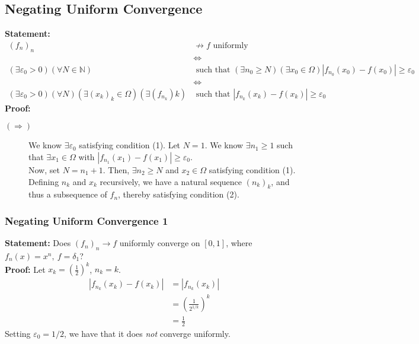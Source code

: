\documentclass[10pt]{extarticle}
\newcommand{\N}{\mathbb{N}}
\begin{document}
  \subsection{Negating Uniform Convergence}%
  \textbf{Statement:}
    \begin{align*}
      (f_n)_n &\nrightarrow f \text{ uniformly }\\
              &\Leftrightarrow\\
      (\exists \varepsilon_0 > 0)(\forall N\in\N)&\text{ such that } (\exists n_0 \geq N)(\exists x_0\in\Omega) \left|f_{n_0}(x_0) - f(x_0)\right| \geq \varepsilon_0\\
                                                 &\Leftrightarrow\\
      (\exists \varepsilon_0 > 0)(\forall N)(\exists (x_k)_k\in\Omega)(\exists \left(f_{n_k}\right)k) &\text{ such that } \left|f_{n_k}(x_k) - f(x_k)\right| \geq \varepsilon_0
    \end{align*}
    \textbf{Proof:}
    \begin{description}
      \item[$(\Rightarrow)$] We know $\exists \varepsilon_0$ satisfying condition (1). Let $N = 1$. We know $\exists n_1 \geq 1$ such that $\exists x_1\in\Omega$ with $|f_{n_1}(x_1) - f(x_1)| \geq \varepsilon_0$.\\

        Now, set $N = n_1 + 1$. Then, $\exists n_2 \geq N$ and $x_2\in\Omega$ satisfying condition (1).\\

        Defining $n_k$ and $x_k$ recursively, we have a natural sequence $(n_k)_k$, and thus a subsequence of $f_n$, thereby satisfying condition (2).
    \end{description}
    \subsubsection{Negating Uniform Convergence 1}%
    \textbf{Statement:} Does $\left(f_n\right)_n \rightarrow f$ uniformly converge on $[0,1]$, where $f_n(x) = x^n,~f = \delta_1$?\\

    \textbf{Proof:} Let $x_k = \left(\frac{1}{2}\right)^k$, $n_k = k$.
    \begin{align*}
      \left|f_{n_k}(x_k) - f(x_k)\right| &= \left|f_{n_k}(x_k)\right|\\
                                         &= \left(\frac{1}{2^{1/k}}\right)^k\\
                                         &= \frac{1}{2}
    \end{align*}
    Setting $\varepsilon_0 = 1/2$, we have that it does \textit{not} converge uniformly.
\end{document}
